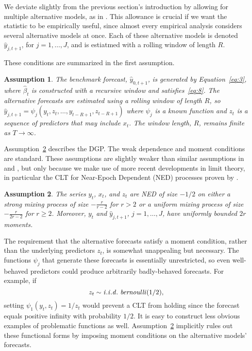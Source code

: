 \documentclass[12pt,fleqn]{article}
\newtheorem{asmp}{Assumption}
\theoremstyle{definition}
\newcommand{\iid}{\ensuremath\mathit{i.i.d.}}
\newcommand{\bernoulli}{\ensuremath\mathit{bernoulli}}
\newcommand{\bh}{\hat{\beta}}
\newcommand{\yh}{\hat{y}}
\begin{document}
We deviate slightly from the previous section's introduction by
allowing for multiple alternative models, as in \cite{HuW:10}. This
allowance is crucial if we want the statistic to be empirically
useful, since almost every empirical analysis considers several
alternative models at once.  Each of these alternative models is
denoted $\yh_{j,t+1}$, for $j = 1,\dots,J$, and is estiatmed with a
rolling window of length $R$.

These conditions are summarized in the first assumption.

\begin{asmp}\label{a1}%
  The benchmark forecast, $\yh_{0,t+1}$, is generated by
  Equation~\eqref{eq:3}, where $\bh_t$ is constructed with a recursive
  window and satisfies~\eqref{eq:8}. The alternative forecasts are
  estimated using a rolling window of length $R$, so $\yh_{j,t+1} =
  \psi_j(y_t,z_t,\dots,y_{t-R+1}, z_{t-R+1})$ where $\psi_j$ is a
  known function and $z_t$ is a sequence of predictors that may
  include $x_t$. The window length, $R$, remains finite as $T \to
  \infty$.
\end{asmp}

Assumption~\ref{a3} describes the DGP. The weak dependence and moment
conditions are standard. These assumptions are slightly weaker than
similar assumptions in \citet{Wes:96} and \citet{Mcc:00}, but only
because we make use of more recent developments in limit theory, in
particular the CLT for Near-Epoch Dependent (NED) processes proven by
\cite{Jon:97}.

\begin{asmp}\label{a3}%
  The series $y_t$, $x_t$, and $z_t$ are NED of size $-1/2$ on either a
  strong mixing process of size $-\frac{r}{r-2}$ for $r>2$ or a uniform
  mixing process of size $-\frac{r}{2r-2}$ for $r \geq 2$. Moreover,
  $y_t$ and $\yh_{j,t+1}$, $j = 1,\dots,J$, have uniformly bounded $2 r$
  moments.
\end{asmp}

The requirement that the alternative forecasts satisfy a moment
condition, rather than the underlying predictors $z_t$, is somewhat
unappealing but necessary. The functions $\psi_j$ that generate these
forecasts is essentially unrestricted, so even well-behaved predictors
could produce arbitrarily badly-behaved forecasts. For example, if
\begin{equation*}
  z_t \sim \iid~\bernoulli(1/2),
\end{equation*}
setting $\psi_1(y_t, z_t) = 1/z_t$ would prevent a CLT from holding
since the forecast equals positive infinity with probability $1/2$. It
is easy to construct less obvious examples of problematic functions as
well. Assumption~\ref{a3} implicitly rules out these functional forms
by imposing moment conditions on the alternative models' forecasts.
\end{document}

